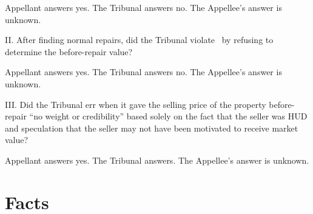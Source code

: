 \documentclass[12pt,\documentclassflag]{michiganCourtOfAppealsBrief}
\begin{document}
Appellant answers yes. The Tribunal answers no. The Appellee's answer is unknown. 
\vspace{\baselineskip}

\noindent II. After finding normal repairs, did the Tribunal violate \mathieuGast\ by refusing to determine the before-repair value?

Appellant answers yes. The Tribunal answers no. The Appellee's answer is unknown. 
\vspace{\baselineskip}

\noindent III. Did the Tribunal err when it gave the selling price of the property before-repair ``no weight or credibility'' based solely on the fact that the seller was HUD and speculation that the seller may not have been motivated to receive market value?

Appellant answers yes. The Tribunal answers. The Appellee's answer is unknown. 








 
\newpage

\section{Facts}
\label{facts}
\end{document}
